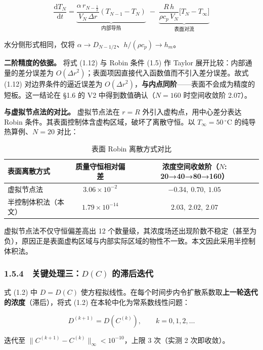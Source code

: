 \documentclass[12pt,a4paper]{ctexart}
\begin{document}
\begin{equation}
\frac{\mathrm{d}T_N}{\mathrm{d}t}=
\underbrace{\frac{\alpha\,r_{N-\frac12}}{V_N\,\Delta r}(T_{N-1}-T_N)}_{\text{内部导热}}
\;-\;\underbrace{\frac{R\,h}{\rho c_p\,V_N}\big[T_N-T_\infty\big]}_{\text{表面对流}}
\tag{1.12}
\end{equation}

水分侧形式相同，仅将 $\alpha\to D_{N-1/2}$、$h/(\rho c_p)\to h_m$。

\textbf{二阶精度的依据。} 将式 (1.12) 与 Robin 条件 (1.5) 作 Taylor 展开比较：内部通量的差分误差为 $O(\Delta r^2)$；表面项因直接代入函数值而不引入差分误差。故式 (1.12) 对边界条件的逼近误差为 $O(\Delta r^2)$，\textbf{与内点同阶}——表面不会成为精度的短板。这一结论在 §1.6 的 V2 中得到数值确认（$N=160$ 时空间收敛阶 2.07）。

\textbf{与虚拟节点法的对比。} 虚拟节点法在 $r=R$ 外引入虚构点，用中心差分表达 Robin 条件。其表面控制体含虚构区域，破坏了离散守恒。以 $T_\infty=50\,^\circ$C 的纯导热算例、$N=20$ 对比：

\begin{table}[H]
\centering
\caption{表面 Robin 离散方式对比}
\small
\begin{tabular}{lcc}
\toprule
表面离散方式 & 质量守恒相对偏差 & 浓度空间收敛阶（$N$: 20→40→80→160） \\
\midrule
虚拟节点法 & $3.06\times10^{-2}$ & $-0.34,\ 0.70,\ 1.05$ \\
半控制体积法（本文） & $1.79\times10^{-14}$ & $2.03,\ 2.02,\ 2.07$ \\
\bottomrule
\end{tabular}
\end{table}

虚拟节点法不仅守恒偏差高出 12 个数量级，其浓度场还出现阶数不稳定（甚至为负），原因正是表面虚构区域与内部实际区域的物性不一致。本文因此采用半控制体积法。

\subsubsection*{1.5.4　关键处理三：$D(C)$ 的滞后迭代}

式 (1.2) 中 $D=D(C)$ 使方程拟线性。在每个时间步内令扩散系数取\textbf{上一轮迭代的浓度}（滞后），将式 (1.2) 在本轮中化为常系数线性问题：

\begin{equation}
D^{(k+1)}=D\!\left(C^{(k)}\right),\qquad k=0,1,2,\dots
\tag{1.13}
\end{equation}

迭代至 $\|C^{(k+1)}-C^{(k)}\|_\infty<10^{-10}$，上限 3 次（实测 2 次即收敛）。
\end{document}
